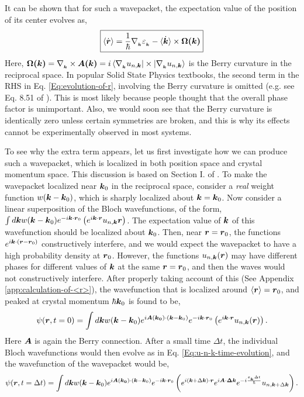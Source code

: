 \documentclass{report}
\renewcommand\vec[1]{\ensuremath\boldsymbol{#1}} %
\begin{document}
It can be shown \cite{ralph2020berry} that for such a wavepacket, the expectation value of the position of its center evolves as,
\begin{equation}\label{Eq:evolution-of-r}
	\boxed{\langle\dot{\vec{r}}\rangle = \frac{1}{\hbar} \nabla{_{_{\vec{k}}}} \varepsilon_{_{\vec{k}}} - \langle\dot{\vec{k}}\rangle \times \vec{\Omega(\vec{k})}}
\end{equation}
Here, $\vec{\Omega(\vec{k})} = \nabla_{_{\vec{k}}} \times \vec{A(\vec{k})} = i \bra{\nabla_{_{\vec{k}}} u_{n,\vec{k}}}\times \ket{\nabla_{_{\vec{k}}} u_{n,\vec{k}}}$ is the Berry curvature in the reciprocal space. In popular Solid State Physics textbooks, the second term in the RHS in Eq. \eqref{Eq:evolution-of-r}, involving the Berry curvature is omitted (e.g. see Eq. 8.51 of \cite{book:AshcroftMermin76}). This is most likely because people thought that the overall phase factor is unimportant. Also, we would soon see that the Berry curvature is identically zero unless certain symmetries are broken, and this is why its effects cannot be experimentally observed in most systems. 

To see why the extra term appears, let us first investigate how we can produce such a wavepacket, which is localized in both position space and crystal momentum space. This discussion is based on Section I. of \cite{ralph2020berry}. To make the wavepacket localized near $\vec{k}_0$ in the reciprocal space, consider a \textit{real} weight function $w(\vec{k} - \vec{k}_0)$, which is sharply localized about $\vec{k} = \vec{k}_0$. Now consider a linear superposition of the Bloch wavefunctions, of the form, $\int d\vec{k} w(\vec{k} - \vec{k}_0) e^{-i \vec{k} \cdot \vec{r}_0 } \left(e^{i \vec{k} \cdot\vec{r}} u_{n,\vec{k}}\vec{r}\right)$. The expectation value of $\vec{k}$ of this wavefunction should be localized about $\vec{k}_0$. Then, near $\vec{r} = \vec{r}_0$, the functions $e^{i \vec{k} \cdot (\vec{r} -\vec{r}_0 )}$ constructively interfere, and we would expect the wavepacket to have a high probability density at $\vec{r}_0$. However, the functions $u_{n,\vec{k}}(\vec{r})$ may have different phases for different values of $\vec{k}$ at the same $\vec{r} = \vec{r}_0$, and then the waves would not constructively interfere.
After properly taking account of this (See Appendix \ref{app:calculation-of-<r>}), the wavefunction that is localized around $\expval{\vec{r}} = \vec{r}_0$, and peaked at crystal momentum $\hbar \vec{k}_0$ is found to be,
$$\psi(\vec{r}, t=0) = \int d\vec{k} w(\vec{k} - \vec{k}_0) e^{i \vec{A}(\vec{k_0})\cdot (\vec{k} - \vec{k}_0)} e^{-i \vec{k} \cdot \vec{r}_0 } \left(e^{i \vec{k} \cdot\vec{r}} u_{n,\vec{k}}(\vec{r})\right).$$
Here $\vec{A}$ is again the Berry connection. After a small time $\Delta t$, the individual Bloch wavefunctions would then evolve as in Eq. \eqref{Eq:u-n-k-time-evolution}, and the wavefunction of the wavepacket would be,
$$\psi(\vec{r}, t=\Delta t) = \int d\vec{k} w(\vec{k} - \vec{k}_0) e^{i \vec{A}(\vec{k_0})\cdot (\vec{k} - \vec{k}_0)} e^{-i \vec{k} \cdot \vec{r}_0 } \left(e^{i (\vec{k} + \Delta\vec{k})\cdot\vec{r}} e^{i \vec{A}\cdot \vec{\Delta{k}}} e^{-i \frac{\varepsilon_{_{\vec{k}}} \Delta t}{\hbar}} u_{n, \vec{k}+\Delta \vec{k}} \right).$$
\end{document}
